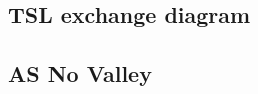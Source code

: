 \subsection{TSL exchange diagram}
\begin{center}
\end{center}
\subsection{AS No Valley}
\begin{center}
\end{center}
